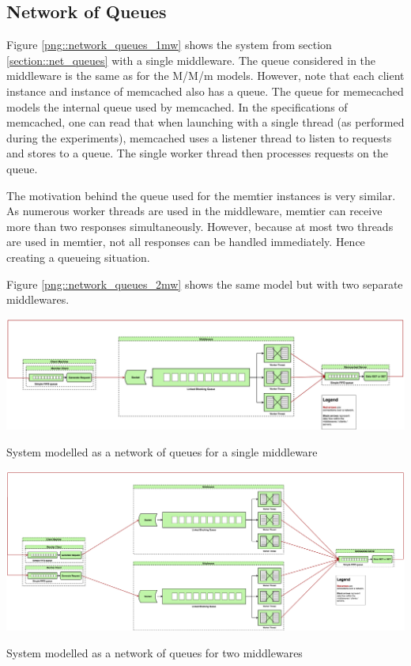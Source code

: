 \documentclass[11pt,a4paper]{article}
\begin{document}
\subsection{Network of Queues}
Figure \ref{png::network_queues_1mw} shows the system from section \ref{section::net_queues} with a single middleware. The queue considered in the middleware is the same as for the M/M/m models. However, note that each client instance and instance of memcached also has a queue. The queue for memecached models the internal queue used by memcached. In the specifications of memcached, one can read that when launching with a single thread (as performed during the experiments), memcached uses a listener thread to listen to requests and stores to a queue. The single worker thread then processes requests on the queue.

The motivation behind the queue used for the memtier instances is very similar. As numerous worker threads are used in the middleware, memtier can receive more than two responses simultaneously. However, because at most two threads are used in memtier, not all responses can be handled immediately. Hence creating a queueing situation.

Figure \ref{png::network_queues_2mw} shows the same model but with two separate middlewares.

\begin{SidewaysFigure}
    \centering
    \begin{minipage}[b]{0.9\paperheight}
        \centering
        \includegraphics[width=0.65\paperheight]{processing/graphics/network_queues_1mw.png}
        \caption{System modelled as a network of queues for a single middleware}
        \label{png::network_queues_1mw}
    \end{minipage}

    \hfill
    \vspace*{1cm}

    \begin{minipage}[b]{0.9\paperheight}
        \centering
        \includegraphics[width=0.65\paperheight]{processing/graphics/network_queues_2mw.png}
        \caption{System modelled as a network of queues for two middlewares}
        \label{png::network_queues_2mw}
    \end{minipage}
\end{SidewaysFigure}
\end{document}
